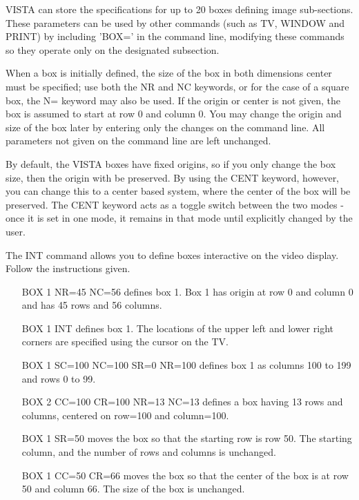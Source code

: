 VISTA can store the specifications for up to 20 boxes defining image
sub-sections.  These parameters can be used by other commands (such as TV,
WINDOW and PRINT) by including 'BOX=' in the command line, modifying these
commands so they operate only on the designated subsection.

When a box is initially defined, the size of the box in both dimensions
center must be specified; use both the NR and NC keywords, or for the case
of a square box, the N= keyword may also be used.  If the origin or center
is not given, the box is assumed to start at row 0 and column 0.  You may
change the origin and size of the box later by entering only the changes on
the command line.  All parameters not given on the command line are left
unchanged.

By default, the VISTA boxes have fixed origins, so if you only change the
box size, then the origin with be preserved. By using the CENT keyword,
however, you can change this to a center based system, where the center of
the box will be preserved. The CENT keyword acts as a toggle switch between
the two modes - once it is set in one mode, it remains in that mode until
explicitly changed by the user.

The INT command allows you to define boxes interactive on the video
display. Follow the instructions given.

\begin{itemize}
  \item[BOX 1 NR=45 NC=56\hfill]{defines box 1.  Box 1 has origin at row 0 and 
       column 0 and has 45 rows and 56 columns.}
  \item[BOX 1 INT\hfill]{defines box 1. The locations of the upper left and 
       lower right corners are specified using the cursor on the TV.}
  \item[BOX 1 SC=100 NC=100 SR=0 NR=100\hfill]{defines box 1 as columns
       100 to 199 and rows 0 to 99.}
  \item[BOX 2 CC=100 CR=100 NR=13 NC=13\hfill]{    defines a box having 13 rows
       and columns, centered on row=100 and column=100.}
\end{itemize}

\begin{itemize}
  \item[BOX 1 SR=50\hfill]{moves the box so that the starting row is row 50. 
       The starting column, and the number of rows and columns is unchanged.}
  \item[BOX 1 CC=50 CR=66\hfill]{moves the box so that the center of the box 
       is at row 50 and column 66.  The size of the box is unchanged.}
\end{itemize}

